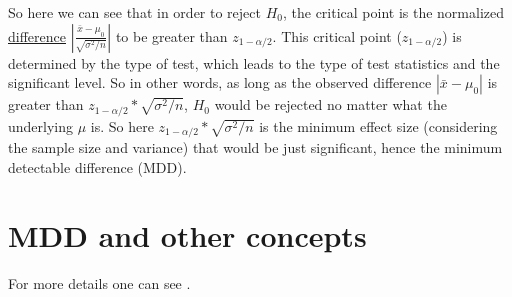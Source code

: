 \documentclass[a4paper,12pt]{article}
\begin{document}
So here we can see that in order to reject $H_0$, the critical point is the normalized \underline{difference} $\left|\frac{\bar{x} - \mu_0}{\sqrt{\sigma^2 / n}}\right|$ to be greater than $z_{1 - \alpha / 2}$. This critical point ($z_{1 - \alpha / 2}$) is determined by the type of test, which leads to the type of test statistics and the significant level. So in other words, as long as the observed difference $\left|\bar{x} - \mu_0\right|$ is greater than $z_{1 - \alpha / 2} * \sqrt{\sigma^2 / n}$, $H_0$ would be rejected no matter what the underlying $\mu$ is. So here $z_{1 - \alpha / 2} * \sqrt{\sigma^2 / n}$ is the minimum effect size (considering the sample size and variance) that would be just significant, hence the minimum detectable difference (MDD).

\section{MDD and other concepts}
\label{sec:mdd-other-concepts}









For more details one can see \citet{Mair2020p2109-2123}.




\end{document}
